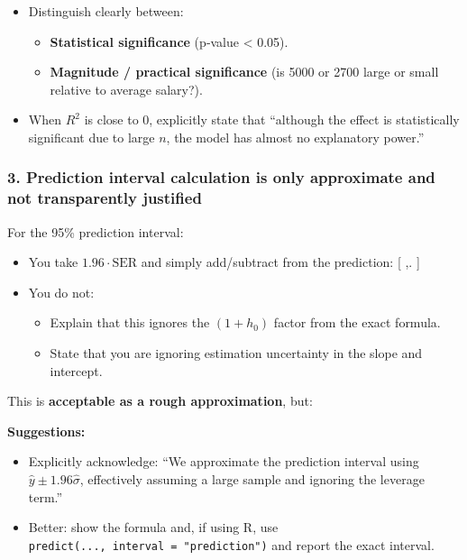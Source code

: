 \documentclass[
  letterpaper,
  DIV=11,
  numbers=noendperiod]{scrartcl}
\providecommand{\tightlist}{%
  \setlength{\itemsep}{0pt}\setlength{\parskip}{0pt}}
\begin{document}
\begin{itemize}
\tightlist
\item
  Distinguish clearly between:

  \begin{itemize}
  \tightlist
  \item
    \textbf{Statistical significance} (p‑value \textless{} 0.05).
  \item
    \textbf{Magnitude / practical significance} (is 5000 or 2700 large
    or small relative to average salary?).\\
  \end{itemize}
\item
  When \(R^2\) is close to 0, explicitly state that ``although the
  effect is statistically significant due to large \(n\), the model has
  almost no explanatory power.''
\end{itemize}

\subsubsection{3. Prediction interval calculation is only approximate
and not transparently
justified}\label{prediction-interval-calculation-is-only-approximate-and-not-transparently-justified}

For the 95\% prediction interval:

\begin{itemize}
\tightlist
\item
  You take \(1.96 \cdot \text{SER}\) and simply add/subtract from the
  prediction: {[}   \cdot \hat\sigma ,. {]}
\item
  You do not:

  \begin{itemize}
  \tightlist
  \item
    Explain that this ignores the \((1 + h_0)\) factor from the exact
    formula.
  \item
    State that you are ignoring estimation uncertainty in the slope and
    intercept.
  \end{itemize}
\end{itemize}

This is \textbf{acceptable as a rough approximation}, but:

\textbf{Suggestions:}

\begin{itemize}
\tightlist
\item
  Explicitly acknowledge: ``We approximate the prediction interval using
  \(\hat y \pm 1.96\hat\sigma\), effectively assuming a large sample and
  ignoring the leverage term.''\\
\item
  Better: show the formula and, if using R, use
  \texttt{predict(...,\ interval\ =\ "prediction")} and report the exact
  interval.
\end{itemize}
\end{document}
